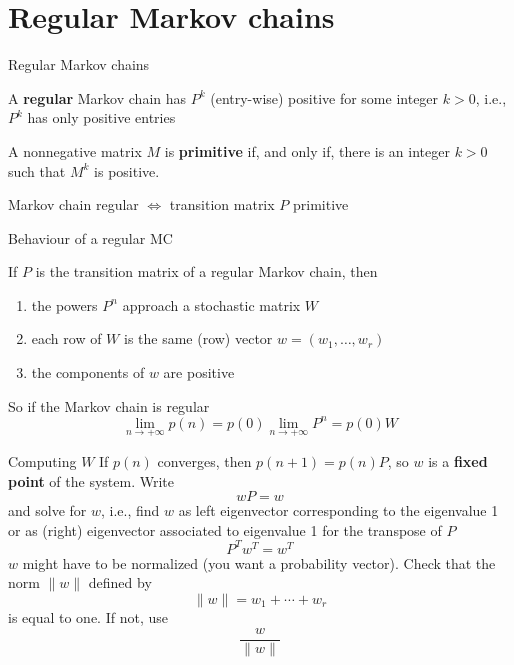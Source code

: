 \documentclass[aspectratio=169]{beamer}
\begin{document}
\section{Regular Markov chains}
\begin{frame}{Regular Markov chains}
\begin{definition}
A \textbf{regular} Markov chain has $P^k$ (entry-wise) positive for some integer $k>0$, i.e., $P^k$ has only positive entries
\end{definition}
\vfill
\begin{definition}
A nonnegative matrix $M$ is \textbf{primitive} if, and only if, there is an integer $k>0$ such that $M^k$ is positive.
\end{definition}
\vfill
\begin{theorem}
Markov chain regular $\iff$ transition matrix $P$ primitive
\end{theorem}
\end{frame}

\begin{frame}{Behaviour of a regular MC}
\begin{theorem}
If $P$ is the transition matrix of a regular Markov chain, then
\begin{enumerate}
\item the powers $P^n$ approach a stochastic matrix $W$
\item each row of $W$ is the same (row) vector $w=(w_1,\ldots,w_r)$
\item the components of $w$ are positive
\end{enumerate}
\end{theorem}
\vfill
So if the Markov chain is regular
\[
\lim_{n\rightarrow +\infty}p(n)=p(0)\lim_{n\rightarrow +\infty}P^n
=p(0)W
\]
\end{frame}


\begin{frame}{Computing $W$}
If $p(n)$ converges, then $p(n+1)=p(n)P$, so $w$ is a \textbf{fixed point} of the system. Write
\[
wP=w
\]
and solve for $w$, i.e., find $w$ as left eigenvector corresponding to the eigenvalue 1
or as (right) eigenvector associated to eigenvalue 1 for the transpose of $P$
\[
P^Tw^T=w^T
\]
\vfill
$w$ might have to be normalized (you want a probability vector). Check that the norm $\|w\|$ defined by
\[
\|w\|=w_1+\cdots+w_r
\]
is equal to one. If not, use
\[
\frac{w}{\|w\|}
\]
\end{frame}
\end{document}
